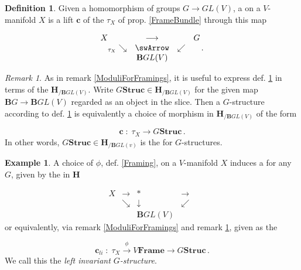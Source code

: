 \documentclass[12pt,titlepage]{article}
\def\mathllap{\mathpalette\mathllapinternal}
\def\mathllapinternal#1#2{\llap{$\mathsurround=0pt#1{#2}$}}
\newcommand{\itexarray}[1]{\begin{matrix}#1\end{matrix}}
\theoremstyle{plain}
\theoremstyle{definition}
\newtheorem{defn}{Definition}
\newtheorem{example}{Example}
\theoremstyle{remark}
\newtheorem{remark}{Remark}
\begin{document}
\begin{defn}
\label{GStructure}\hypertarget{GStructure}{}
Given a homomorphism of groups $G \longrightarrow GL(V)$, a \emph{} on a $V$-manifold $X$ is a lift $\mathbf{c}$ of the  $\tau_X$ of prop. \ref{FrameBundle} through this map

\begin{displaymath}
\itexarray{
    X && \stackrel{}{\longrightarrow} && G
    \\
    & {}_{\mathllap{\tau_X}}\searrow &\swArrow& \swarrow
    \\
    && \mathbf{B}GL(V)
  }
  \,.
\end{displaymath}
\end{defn}
\begin{remark}
\label{ModuliForGStructures}\hypertarget{ModuliForGStructures}{}
As in remark \ref{ModuliForFramings}, it is useful to express def. \ref{GStructure} in terms of the  $\mathbf{H}_{/\mathbf{B}GL(V)}$. Write $G\mathbf{Struc}\in \mathbf{H}_{/\mathbf{B}GL(V)}$ for the given map $\mathbf{B}G\to \mathbf{B}GL(V)$ regarded as an object in the slice. Then a $G$-structure according to def. \ref{GStructure} is equivalently a choice of morphism in $\mathbf{H}_{/\mathbf{B}GL(V)}$ of the form

\begin{displaymath}
\mathbf{c} \;\colon\; \tau_X \longrightarrow G\mathbf{Struc}
  \,.
\end{displaymath}
In other words, $G\mathbf{Struc} \in \mathbf{H}_{/\mathbf{B}GL(v)}$ is the \emph{} for $G$-structures.

\end{remark}
\begin{example}
\label{GStructureFromLeftTranslationFraming}\hypertarget{GStructureFromLeftTranslationFraming}{}
A choice of  $\phi$, def. \ref{Framing}, on a $V$-manifold $X$ induces a  for any $G$, given by the  in $\mathbf{H}$

\begin{displaymath}
\itexarray{
     X &\longrightarrow& \ast &\longrightarrow&
     \\
     & \searrow & \downarrow & \swarrow
     \\
     && \mathbf{B}GL(V)
  }
\end{displaymath}
or equivalently, via remark \ref{ModuliForFramings} and remark \ref{ModuliForGStructures}, given as the 

\begin{displaymath}
\mathbf{c}_{li}
  \;\colon\;
  \tau_X \stackrel{\phi}{\longrightarrow} V\mathbf{Frame} \longrightarrow G\mathbf{Struc}\,.
\end{displaymath}
We call this the \emph{left invariant $G$-structure}.

\end{example}
\end{document}
